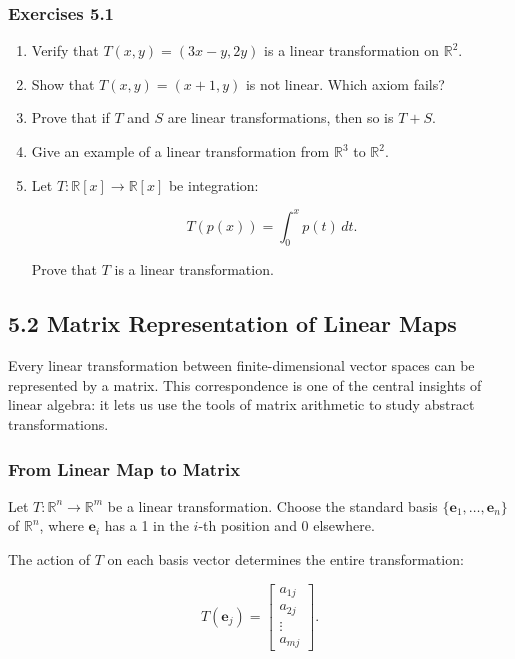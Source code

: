 \documentclass[
  12pt,
  a4paper,
]{article}
\begin{document}
\subsubsection{Exercises 5.1}\label{exercises-51}

\begin{enumerate}
\def\labelenumi{\arabic{enumi}.}
\item
  Verify that \(T(x,y) = (3x-y, 2y)\) is a linear transformation on
  \(\mathbb{R}^2\).
\item
  Show that \(T(x,y) = (x+1, y)\) is not linear. Which axiom fails?
\item
  Prove that if \(T\) and \(S\) are linear transformations, then so is
  \(T+S\).
\item
  Give an example of a linear transformation from \(\mathbb{R}^3\) to
  \(\mathbb{R}^2\).
\item
  Let \(T:\mathbb{R}[x] \to \mathbb{R}[x]\) be integration:

  \[T(p(x)) = \int_0^x p(t)\,dt.\]

  Prove that \(T\) is a linear transformation.
\end{enumerate}

\subsection{5.2 Matrix Representation of Linear
Maps}\label{52-matrix-representation-of-linear-maps}

Every linear transformation between finite-dimensional vector spaces can
be represented by a matrix. This correspondence is one of the central
insights of linear algebra: it lets us use the tools of matrix
arithmetic to study abstract transformations.

\subsubsection{From Linear Map to
Matrix}\label{from-linear-map-to-matrix}

Let \(T: \mathbb{R}^n \to \mathbb{R}^m\) be a linear transformation.
Choose the standard basis \(\{ \mathbf{e}_1, \dots, \mathbf{e}_n \}\) of
\(\mathbb{R}^n\), where \(\mathbf{e}_i\) has a 1 in the \(i\)-th
position and 0 elsewhere.

The action of \(T\) on each basis vector determines the entire
transformation:

\[T(\mathbf{e}_j) = \begin{bmatrix} a_{1j} \\ a_{2j} \\ \vdots \\ a_{mj} \end{bmatrix}.\]
\end{document}
